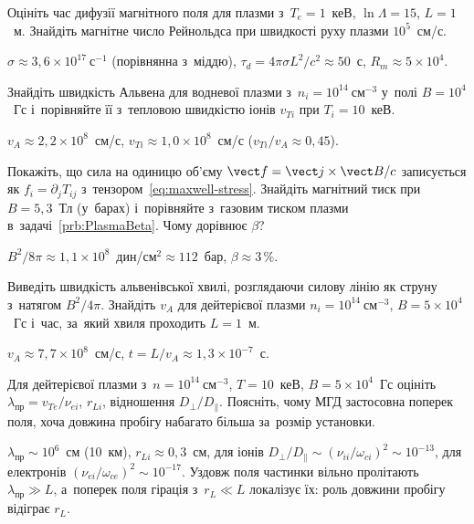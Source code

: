 \begin{problem}\label{prb:PlasmaDiffusion}
	Оцініть час дифузії магнітного поля для плазми з~$T_e=1$~кеВ,
	$\ln\Lambda=15$, $L=1$~м. Знайдіть магнітне число Рейнольдса при швидкості руху плазми
	$10^5$~см/с.
	\begin{solution}
		$\sigma\approx3{,}6\times10^{17}~\mathrm{с}^{-1}$ (порівнянна з~міддю), $\tau_d=4\pi\sigma L^2/c^2\approx50$~с, $R_m\approx5\times10^4$.
	\end{solution}
\end{problem}

\begin{problem}\label{prb:PlasmaAlfven}
	Знайдіть швидкість Альвена для водневої плазми з~$n_i=10^{14}~\mathrm{см}^{-3}$ у~полі
	$B=10^4$~Гс і~порівняйте її з~тепловою швидкістю іонів $v_{Ti}$ при $T_i=10$~кеВ.
	\begin{solution}
		$v_A\approx2{,}2\times10^{8}$~см/с, $v_{Ti}\approx1{,}0\times10^{8}$~см/с ($v_{Ti}/v_A\approx0{,}45$).
	\end{solution}
\end{problem}

\begin{problem}\label{prb:MaxwellStress}
	Покажіть, що сила на одиницю об'єму $\vect f=\vect j\times\vect B/c$ записується як
	$f_i=\partial_jT_{ij}$ з~тензором~\eqref{eq:maxwell-stress}. Знайдіть
	магнітний тиск при $B=5{,}3$~Тл (у~барах) і~порівняйте з~газовим тиском плазми
	в~задачі~\ref{prb:PlasmaBeta}. Чому дорівнює $\beta$?
	\begin{solution}
		$B^2/8\pi\approx1{,}1\times10^{8}$~дин/см$^2\approx112$~бар, $\beta\approx3\,\%$.
	\end{solution}
\end{problem}

\begin{problem}\label{prb:AlfvenString}
	Виведіть швидкість альвенівської хвилі, розглядаючи силову лінію як струну з~натягом
	$B^2/4\pi$. Знайдіть $v_A$ для дейтерієвої плазми $n_i=10^{14}~\mathrm{см}^{-3}$,
	$B=5\times10^4$~Гс і~час, за~який хвиля проходить $L=1$~м.
	\begin{solution}
		$v_A\approx7{,}7\times10^{8}$~см/с, $t=L/v_A\approx1{,}3\times10^{-7}$~с.
	\end{solution}
\end{problem}

\begin{problem}\label{prb:FluidScales}
	Для дейтерієвої плазми з~$n=10^{14}~\mathrm{см}^{-3}$, $T=10$~кеВ, $B=5\times10^4$~Гс оцініть
	$\lambda_{\mathrm{пр}}=v_{Te}/\nu_{ei}$, $r_{Li}$, відношення $D_\perp/D_\parallel$.
	Поясніть, чому МГД застосовна поперек поля, хоча довжина пробігу набагато більша
	за~розмір установки.
	\begin{solution}
		$\lambda_{\mathrm{пр}}\sim10^{6}$~см (10~км), $r_{Li}\approx0{,}3$~см, для іонів $D_\perp/D_\parallel\sim(\nu_{ii}/\omega_{ci})^2\sim10^{-13}$, для електронів $(\nu_{ei}/\omega_{ce})^2\sim10^{-17}$.
	Уздовж поля частинки вільно пролітають $\lambda_{\mathrm{пр}}\gg L$, а~поперек поля гірація з~$r_L\ll L$ локалізує їх: роль довжини пробігу відіграє $r_L$.
	\end{solution}
\end{problem}

